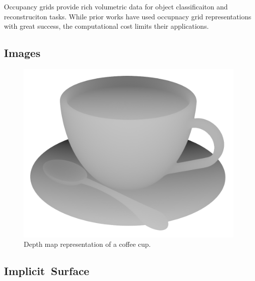 Occupancy grids provide rich volumetric data for object classificaiton and reconstruciton tasks. While prior works have used occupnacy grid representations with great success, the computational cost limits their applications.

\newpage


\subsection{Images}

\begin{figure}[ht]
	\centering
	\includegraphics[scale=0.2]{Images/Depth Map Cup}
	\caption{Depth map representation of a coffee cup.}
	\label{fig:depth_map_cup}
\end{figure}

\subsection{Implicit~Surface}
\label{subsec:implicit_surface}

